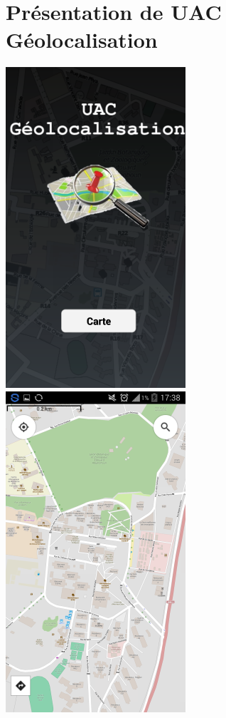 \documentclass[11pt,handout]{beamer}
\begin{document}
	\section{Présentation de UAC Géolocalisation}
		      \begin{frame}
			  \hspace{0.7cm}
			  \includegraphics[scale=0.45]{images/accueil.png}
			  \hspace{0.5cm}
			  \includegraphics[scale=0.45]{images/carte.png}
		      \end{frame}
		      
\end{document}
